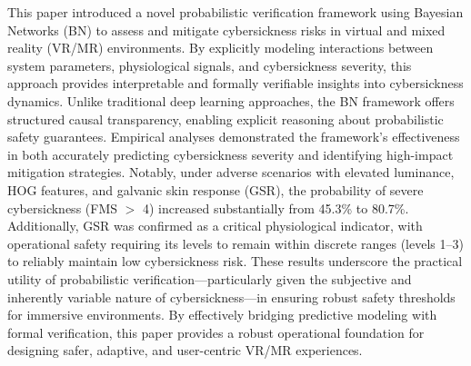 \documentclass{vgtc}                          %
\begin{document}
This paper introduced a novel probabilistic verification framework using Bayesian Networks (BN) to assess and mitigate cybersickness risks in virtual and mixed reality (VR/MR) environments. By explicitly modeling interactions between system parameters, physiological signals, and cybersickness severity, this approach provides interpretable and formally verifiable insights into cybersickness dynamics. Unlike traditional deep learning approaches, the BN framework offers structured causal transparency, enabling explicit reasoning about probabilistic safety guarantees.
Empirical analyses demonstrated the framework's effectiveness in both accurately predicting cybersickness severity and identifying high-impact mitigation strategies. Notably, under adverse scenarios with elevated luminance, HOG features, and galvanic skin response (GSR), the probability of severe cybersickness (FMS $>$ 4) increased substantially from 45.3\% to 80.7\%. Additionally, GSR was confirmed as a critical physiological indicator, with operational safety requiring its levels to remain within discrete ranges (levels 1–3) to reliably maintain low cybersickness risk. These results underscore the practical utility of probabilistic verification—particularly given the subjective and inherently variable nature of cybersickness—in ensuring robust safety thresholds for immersive environments.
By effectively bridging predictive modeling with formal verification, this paper provides a robust operational foundation for designing safer, adaptive, and user-centric VR/MR experiences.
\end{document}

